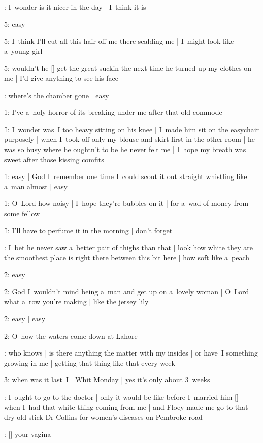 :
I~wonder is it nicer in the day |
I~think it is

\f5:
easy

\f5:
I~think I'll cut all this hair off me there scalding me |
I~might look like a~young girl

\f5:
wouldn't he [\boylan] get the great suckin
the next time he turned up my clothes on me |
I'd give anything to see his face

:
where's the chamber gone |
easy

\f1:
I've a~holy horror of its breaking under me after that old commode

\f1:
I~wonder was~I too heavy sitting on his knee |
I~made him sit on the easychair purposely |
when I~took off only my blouse and skirt first in the other room |
he was so busy where he oughtn't to be he never felt me |
I~hope my breath was sweet after those kissing comfits

\f1:
easy |
God I~remember one time I~could scout it out straight whistling like a~man almost |
easy

\f1:
O~Lord how noisy |
I~hope they're bubbles on it |
for a~wad of money from some fellow

\f1:
I'll have to perfume it in the morning |
don't forget

:
I~bet he never saw a~better pair of thighs than that |
look how white they are |
the smoothest place is right there between this bit here |
how soft like a~peach

\f2:
easy

\f2:
God I~wouldn't mind being a~man and get up on a~lovely woman |
O~Lord what a~row you're making |
like the jersey lily

\f2:
easy |
easy

\f2:
O~how the waters come down at Lahore





:
who knows |
is there anything the matter with my insides |
or have~I something growing in me |
getting that thing like that every week

\f3:
when was it last~I |
Whit Monday |
yes it's only about 3~weeks

:
I~ought to go to the doctor |
only it would be like before I~married him [\bloom] |
when I~had that white thing coming from me |
and Floey made me go to that dry old stick Dr Collins
for women's diseases on Pembroke road

:
[\collins] your vagina

